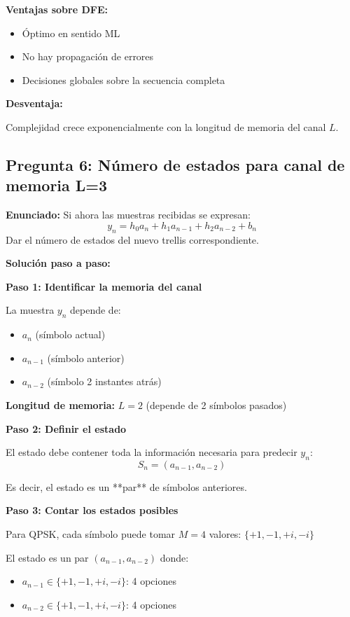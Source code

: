 \documentclass[11pt,a4paper]{article}
\begin{document}
\textbf{Ventajas sobre DFE:}

\begin{itemize}
    \item \'Optimo en sentido ML
    \item No hay propagaci\'on de errores
    \item Decisiones globales sobre la secuencia completa
\end{itemize}

\textbf{Desventaja:}

Complejidad crece exponencialmente con la longitud de memoria del canal $L$.



\subsection*{Pregunta 6: N\'umero de estados para canal de memoria L=3}

\textbf{Enunciado:} Si ahora las muestras recibidas se expresan:
\[
y_n = h_0 a_n + h_1 a_{n-1} + h_2 a_{n-2} + b_n
\]
Dar el n\'umero de estados del nuevo trellis correspondiente.

\vspace{0.3cm}
\textbf{Soluci\'on paso a paso:}

\textbf{Paso 1: Identificar la memoria del canal}

La muestra $y_n$ depende de:
\begin{itemize}
    \item $a_n$ (s\'imbolo actual)
    \item $a_{n-1}$ (s\'imbolo anterior)
    \item $a_{n-2}$ (s\'imbolo 2 instantes atr\'as)
\end{itemize}

\textbf{Longitud de memoria:} $L = 2$ (depende de 2 s\'imbolos pasados)

\textbf{Paso 2: Definir el estado}

El estado debe contener toda la informaci\'on necesaria para predecir $y_n$:
\[
S_n = (a_{n-1}, a_{n-2})
\]

Es decir, el estado es un **par** de s\'imbolos anteriores.

\textbf{Paso 3: Contar los estados posibles}

Para QPSK, cada s\'imbolo puede tomar $M = 4$ valores: $\{+1, -1, +i, -i\}$

El estado es un par $(a_{n-1}, a_{n-2})$ donde:
\begin{itemize}
    \item $a_{n-1} \in \{+1, -1, +i, -i\}$: 4 opciones
    \item $a_{n-2} \in \{+1, -1, +i, -i\}$: 4 opciones
\end{itemize}
\end{document}
